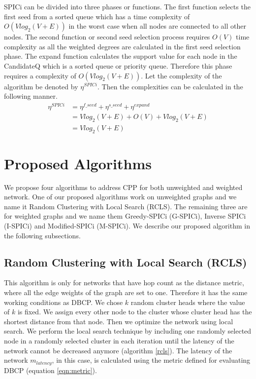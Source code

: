\documentclass[times]{dacauth}
\begin{document}
\smallskip
SPICi can be divided into three phases or functions. The first function selects the first seed from a sorted queue which has a time complexity of $O(Vlog_2(V+E))$ in the worst case when all nodes are connected to all other nodes. The second function or second seed selection process requires $O(V)$ time complexity as all the weighted degrees are calculated in the first seed selection phase. The expand function calculates the support value for each node in the CandidateQ which is a sorted queue or priority queue. Therefore this phase requires a complexity of $O(Vlog_2(V+E))$.
Let the complexity of the algorithm be denoted by $\eta^{SPICi}$. Then the complexities can be calculated in the following manner.
\begin{equation}
\begin{split}
\eta^{SPICi} &= \eta^{f\_seed} + \eta^{s\_seed} + \eta^{expand}\\
&= Vlog_2(V+E) + O(V) + Vlog_2(V+E)\\
&=Vlog_2(V+E)
\end{split}
\end{equation}

\section{Proposed Algorithms} \label {proposedalgo}
We propose four algorithms to address CPP for both unweighted and weighted network. One of our proposed algorithms work on unweighted graphs and we name it Random Clustering with Local Search (RCLS). The remaining three are for weighted graphs and we name them Greedy-SPICi (G-SPICi), Inverse SPICi (I-SPICi) and Modified-SPICi (M-SPICi). We describe our proposed algorithm in the following subsections.

\subsection{Random Clustering with Local Search (RCLS)}
This algorithm is only for networks that have hop count as the distance metric, where all the edge weights of the graph are set to one. Therefore it has the same working conditions as DBCP.
We chose $k$ random cluster heads where the value of $k$ is fixed. We assign every other node to the cluster whose cluster head has the shortest distance from that node. Then we optimize the network using local search. We perform the local search technique by including one randomly selected node in a randomly selected cluster in each iteration until the latency of the network cannot be decreased anymore (algorithm \ref{rcls}). The latency of the network $m_{latency}$, in this case, is calculated using the metric defined for evaluating DBCP (equation \ref{eqn:metric}).
\end{document}
